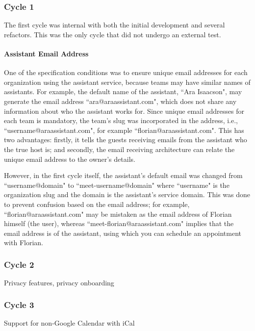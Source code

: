 \documentclass{article}
\begin{document}
\subsubsection{Cycle 1}

The first cycle was internal with both the initial development and several refactors. This was the only cycle that did not undergo an external test.

\paragraph{Assistant Email Address}

One of the specification conditions was to ensure unique email addresses for each organization using the assistant service, because teams may have similar names of assistants. For example, the default name of the assistant, ``Ara Isaacson", may generate the email address ``ara@araassistant.com", which does not share any information about who the assistant works for. Since unique email addresses for each team is mandatory, the team's slug was incorporated in the address, i.e., ``username@araassistant.com", for example ``florian@araassistant.com". This has two advantages: firstly, it tells the guests receiving emails from the assistant who the true host is; and secondly, the email receiving architecture can relate the unique email address to the owner's details.

However, in the first cycle itself, the assistant's default email was changed from ``username@domain" to ``meet-username@domain" where ``username" is the organization slug and the domain is the assistant's service domain. This was done to prevent confusion based on the email address; for example, ``florian@araassistant.com" may be mistaken as the email address of Florian himself (the user), whereas ``meet-florian@araassistant.com" implies that the email address is of the assistant, using which you can schedule an appointment with Florian.

\subsubsection{Cycle 2}

Privacy features, privacy onboarding

\subsubsection{Cycle 3}

Support for non-Google Calendar with iCal
\end{document}
